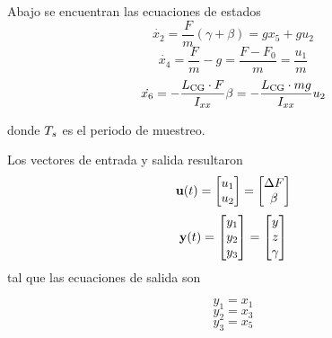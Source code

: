 Abajo se encuentran las ecuaciones de estados
\begin{equation}
	\dot{x_2} = \frac{F}{m} \left( \gamma+\beta \right) = g x_5 + g u_2 
\end{equation}
\begin{equation}
\dot{x_4} = \frac{F}{m} - g =\frac{F-F_0}{m}= \frac{u_1}{m}
\end{equation}
\begin{equation}
\dot{x_6} = -\frac{L_{\mathrm{CG}} \cdot F}{I_{xx}} \beta = -\frac{L_{\mathrm{CG}} \cdot mg}{I_{xx}} u_2 
\end{equation}

donde $T_s$ es el periodo de muestreo.

Los vectores de entrada y salida resultaron
\[
\mathbf{u}(t) = \begin{bmatrix}
u_1 \\
u_2
\end{bmatrix} = \begin{bmatrix}
\Delta F \\
\beta
\end{bmatrix}
\]
\[
\mathbf{y}(t) = \begin{bmatrix}
y_1 \\
y_2 \\
y_3
\end{bmatrix} = \begin{bmatrix}
y \\
z \\
\gamma
\end{bmatrix}
\]
tal que las ecuaciones de salida son

\begin{equation}
	y_1 = x_1 
\end{equation}
\begin{equation}
	y_2 = x_3
\end{equation}
\begin{equation}
	y_3 = x_5
\end{equation}

